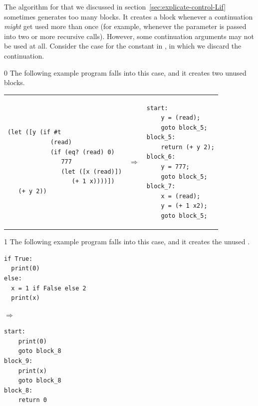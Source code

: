 \documentclass[7x10]{TimesAPriori_MIT}%
\def\racketEd{0}
\def\pythonEd{1}
\providecommand{\BookEdition}{1}
\let\edition\BookEdition
\numberwithin{theorem}{chapter}
\numberwithin{definition}{chapter}
\numberwithin{equation}{chapter}
\begin{document}
The algorithm for  that we discussed in
section~\ref{sec:explicate-control-Lif} sometimes generates too many
blocks. It creates a block whenever a continuation \emph{might} get
used more than once (for example, whenever the  parameter
is passed into two or more recursive calls). However, some
continuation arguments may not be used at all. Consider the case for
the constant \TRUE{} in , in which we discard
the  continuation.
%
{\if\edition\racketEd
The following example program falls into this
case, and it creates two unused blocks.       
\begin{center}
\begin{tabular}{lll}
\begin{minipage}{0.4\textwidth}
\begin{lstlisting}
(let ([y (if #t
            (read)
            (if (eq? (read) 0)
               777
               (let ([x (read)])
                  (+ 1 x))))])
   (+ y 2))
\end{lstlisting}
\end{minipage}
&
$\Rightarrow$
&
\begin{minipage}{0.4\textwidth}
\begin{lstlisting}
start:
    y = (read);
    goto block_5;
block_5:
    return (+ y 2);
block_6:
    y = 777;
    goto block_5;
block_7:
    x = (read);
    y = (+ 1 x2);
    goto block_5;
\end{lstlisting}
\end{minipage}
\end{tabular} 
\end{center}
\fi}
{\if\edition\pythonEd
The following example program falls into this
case, and it creates the unused .       
\begin{center}
\begin{minipage}{0.4\textwidth}
\begin{lstlisting}
if True:
  print(0)
else:
  x = 1 if False else 2
  print(x)
\end{lstlisting}
\end{minipage}
$\Rightarrow\qquad\qquad$
\begin{minipage}{0.4\textwidth}
\begin{lstlisting}
start:
    print(0)
    goto block_8
block_9:
    print(x)
    goto block_8
block_8:
    return 0
\end{lstlisting}
\end{minipage}
\end{center}
\fi}
\end{document}
